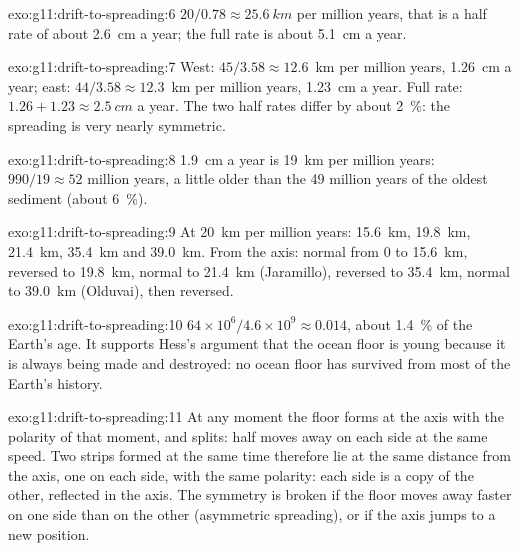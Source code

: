\begin{solution}{exo:g11:drift-to-spreading:6}
$20/0.78 \approx \qty{25.6}{km}$ per million years, that is a half rate of
about \qty{2.6}{cm} a year; the full rate is about \qty{5.1}{cm} a year.
\end{solution}

\begin{solution}{exo:g11:drift-to-spreading:7}
West: $45/3.58 \approx 12.6$~km per million years, \qty{1.26}{cm} a year;
east: $44/3.58 \approx 12.3$~km per million years, \qty{1.23}{cm} a year.
Full rate: $1.26 + 1.23 \approx \qty{2.5}{cm}$ a year. The two half rates
differ by about \qty{2}{\percent}: the spreading is very nearly symmetric.
\end{solution}

\begin{solution}{exo:g11:drift-to-spreading:8}
\qty{1.9}{cm} a year is \qty{19}{km} per million years: $990/19 \approx 52$
million years, a little older than the 49 million years of the oldest sediment
(about \qty{6}{\percent}).
\end{solution}

\begin{solution}{exo:g11:drift-to-spreading:9}
At \qty{20}{km} per million years: \qty{15.6}{km}, \qty{19.8}{km},
\qty{21.4}{km}, \qty{35.4}{km} and \qty{39.0}{km}. From the axis: normal from 0
to \qty{15.6}{km}, reversed to \qty{19.8}{km}, normal to \qty{21.4}{km}
(Jaramillo), reversed to \qty{35.4}{km}, normal to \qty{39.0}{km} (Olduvai),
then reversed.
\end{solution}

\begin{solution}{exo:g11:drift-to-spreading:10}
$64 \times 10^6/4.6 \times 10^9 \approx \num{0.014}$, about
\qty{1.4}{\percent} of the Earth's age. It supports Hess's argument that the
ocean floor is young because it is always being made and destroyed: no
ocean floor has survived from most of the Earth's history.
\end{solution}

\begin{solution}{exo:g11:drift-to-spreading:11}
At any moment the floor forms at the axis with the polarity of that moment,
and splits: half moves away on each side at the same speed. Two strips formed
at the same time therefore lie at the same distance from the axis, one on each
side, with the same polarity: each side is a copy of the other, reflected in
the axis. The symmetry is broken if the floor moves away faster on one side
than on the other (asymmetric spreading), or if the axis jumps to a new
position.
\end{solution}

